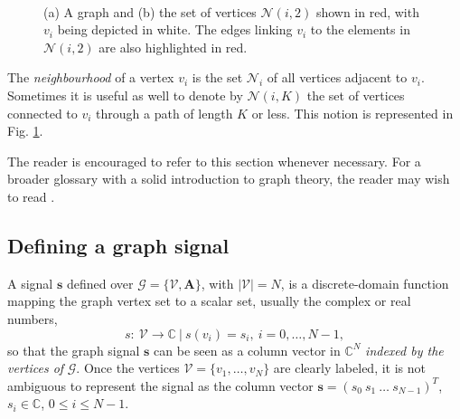 \begin{figure}
	\centering
	~
	\caption{(a) A graph and (b) the set of vertices $ \mathcal{N}(i,2) $ shown in red, with $ v_i $ being depicted in white. The edges linking $ v_i $ to the elements in $ \mathcal{N}(i,2) $ are also highlighted in red.}%
	\label{fig:k_hop_neighborhood}%
\end{figure}

The \emph{neighbourhood} of a vertex $ v_i $ is the set $ \mathcal{N}_i $ of all vertices adjacent to $ v_i $. Sometimes it is useful as well to denote by $ \mathcal{N}(i,K) $ the set of vertices connected to $ v_i $ through a path of length $ K $ or less. This notion is represented in Fig. \ref{fig:k_hop_neighborhood}.

The reader is encouraged to refer to this section whenever necessary. For a broader glossary with a solid introduction to graph theory, the reader may wish to read \cite{murty2008graph, chung1997spectral}.


\subsection{Defining a graph signal}

A signal $ \mathbf{s} $ defined over $ \mathcal{G} = \{\mathcal{V}, \mathbf{A}\} $, with $ |\mathcal{V}| = N $, is a discrete-domain function mapping the graph vertex set to a scalar set, usually the complex or real numbers,
\begin{equation}
\label{eq:def_signal}
s: \ \mathcal{V} \rightarrow \mathbb{C} \ | \ s(v_i) = s_i, \ i=0, \dots, N-1,
\end{equation}
so that the graph signal $ \mathbf{s} $ can be seen as a column vector in $ \mathbb{C}^N $ \emph{indexed by the vertices of} $ \mathcal{G} $. Once the vertices $ \mathcal{V} = \{v_1, \dots, v_N\}$ are clearly labeled, it is not ambiguous to represent the signal as the column vector $ \mathbf{s} = (s_0 \ s_1 \ \dots \ s_{N-1})^T$, $ s_i \in \mathbb{C} $, $ 0 \leq i \leq N-1 $.

